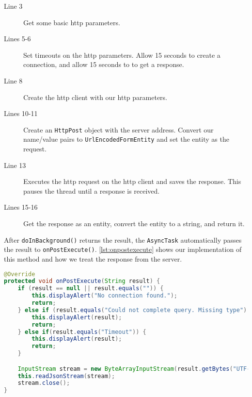 \begin{description}
\item[Line 3] Get some basic \ac {http} parameters.
\item[Lines 5-6] Set timeouts on the \ac {http} parameters. Allow 15 seconds to create a connection, and allow 15 seconds to to get a response.
\item[Line 8] Create the \ac {http} client with our \ac {http} parameters.
\item[Lines 10-11] Create an \lstinline|HttpPost| object with the server address. Convert our name/value pairs to \lstinline|UrlEncodedFormEntity| and set the entity as the request.
\item[Line 13] Executes the \ac {http} request on the \ac {http} client and saves the response. This pauses the thread until a response is received.
\item[Lines 15-16] Get the response as an entity, convert the entity to a string, and return it.
\end{description}
After \lstinline|doInBackground()| returns the result, the \lstinline|AsyncTask| automatically passes the result to \lstinline|onPostExecute()|. \autoref{lst:onpostexecute} shows our implementation of this method and how we treat the response from the server.

\begin{lstlisting}[language=java, label=lst:onpostexecute, caption={The async method \lstinline|onPostExecute()|}]
@Override
protected void onPostExecute(String result) {
    if (result == null || result.equals("")) {
        this.displayAlert("No connection found.");
        return;
    } else if (result.equals("Could not complete query. Missing type") || result.equals("Missing request code!")) {
        this.displayAlert(result);
        return;
    } else if(result.equals("Timeout")) {
        this.displayAlert(result);
        return;
    }

    InputStream stream = new ByteArrayInputStream(result.getBytes("UTF-8"));
    this.readJsonStream(stream);
    stream.close();
}
\end{lstlisting}

